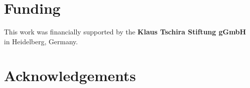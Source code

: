 \documentclass{bioinfo}
\begin{document}

\section*{Funding}
\label{sec:Funding}

This work was financially supported by the \textbf{Klaus Tschira Stiftung gGmbH} in Heidelberg, Germany.

\section*{Acknowledgements}
\label{sec:Acknowledgements}




%
%
%
%
%
%
%







\end{document}
